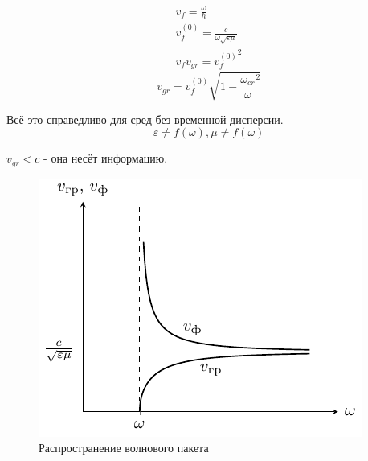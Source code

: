 \begin{enumerate}
\begin{gather*}
v_{f} = \frac{\omega}{h}\\
v_{f}^{(0)} = \frac{c}{\omega \sqrt{\varepsilon \mu}}\\
%
v_{f} v_{gr} = {v_f^{(0)}}^2
\end{gather*}
\begin{equation*}
v_{gr} = v_{f}^{(0)} \sqrt{1 - {\frac{\omega_{cr}}{\omega}^2}}
\end{equation*}

Всё это справедливо для сред без временной дисперсии.
\begin{equation*}
\varepsilon\ne f(\omega), \mu \ne f(\omega)
\end{equation*}



$v_{gr} < c$ - она несёт информацию.
\end{enumerate}
\begin{figure}[h!]
\centering
\includegraphics[scale=1]{img/lect3_ris10}
\caption{Распространение волнового пакета}
\label{fig:lect3:10}
\end{figure}
